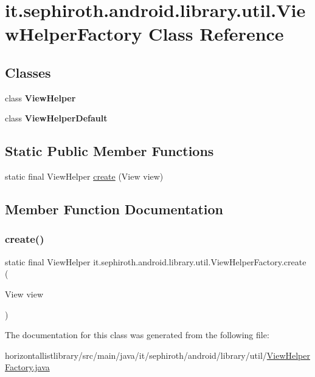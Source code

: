 \hypertarget{classit_1_1sephiroth_1_1android_1_1library_1_1util_1_1_view_helper_factory}{}\section{it.\+sephiroth.\+android.\+library.\+util.\+View\+Helper\+Factory Class Reference}
\label{classit_1_1sephiroth_1_1android_1_1library_1_1util_1_1_view_helper_factory}
\subsection*{Classes}
\begin{DoxyCompactItemize}
\item 
class {\bfseries View\+Helper}
\item 
class {\bfseries View\+Helper\+Default}
\end{DoxyCompactItemize}
\subsection*{Static Public Member Functions}
\begin{DoxyCompactItemize}
\item 
static final View\+Helper \hyperlink{classit_1_1sephiroth_1_1android_1_1library_1_1util_1_1_view_helper_factory_ae762f335958755a2fc44c0270c6124e2}{create} (View view)
\end{DoxyCompactItemize}


\subsection{Member Function Documentation}
\mbox{\label{classit_1_1sephiroth_1_1android_1_1library_1_1util_1_1_view_helper_factory_ae762f335958755a2fc44c0270c6124e2}} 
\subsubsection{\texorpdfstring{create()}{create()}}
{\footnotesize\ttfamily static final View\+Helper it.\+sephiroth.\+android.\+library.\+util.\+View\+Helper\+Factory.\+create (\begin{DoxyParamCaption}\item[{View}]{view }\end{DoxyParamCaption})\hspace{0.3cm}{\ttfamily [static]}}



The documentation for this class was generated from the following file\+:\begin{DoxyCompactItemize}
\item 
horizontallistlibrary/src/main/java/it/sephiroth/android/library/util/\hyperlink{_view_helper_factory_8java}{View\+Helper\+Factory.\+java}\end{DoxyCompactItemize}

